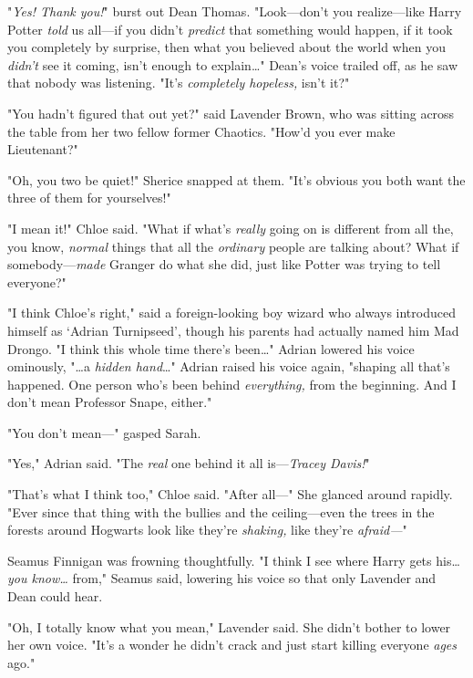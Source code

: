 "\emph{Yes! Thank you!}" burst out Dean Thomas. "Look---don't you 
realize---like Harry Potter \emph{told} us all---if you didn't \emph{predict} 
that something would happen, if it took you completely by surprise, then what 
you believed about the world when you \emph{didn't} see it coming, isn't enough 
to explain{\ldots}" Dean's voice trailed off, as he saw that nobody was 
listening. "It's \emph{completely hopeless,} isn't it?"

"You hadn't figured that out yet?" said Lavender Brown, who was sitting across 
the table from her two fellow former Chaotics. "How'd you ever make Lieutenant?"

"Oh, you two be quiet!" Sherice snapped at them. "It's obvious you both want 
the three of them for yourselves!"

"I mean it!" Chloe said. "What if what's \emph{really} going on is different 
from all the, you know, \emph{normal} things that all the \emph{ordinary} 
people are talking about? What if somebody---\emph{made} Granger do what she 
did, just like Potter was trying to tell everyone?"

"I think Chloe's right," said a foreign-looking boy wizard who always 
introduced himself as `Adrian Turnipseed', though his parents had actually 
named him Mad Drongo. "I think this whole time there's been{\ldots}" Adrian 
lowered his voice ominously, "{\ldots}a \emph{hidden hand}{\ldots}" Adrian 
raised his voice again, "shaping all that's happened. One person who's been 
behind \emph{everything,} from the beginning. And I don't mean Professor Snape, 
either."

"You don't mean---" gasped Sarah.

"Yes," Adrian said. "The \emph{real} one behind it all is---\emph{Tracey 
Davis!}"

"That's what I think too," Chloe said. "After all---" She glanced around 
rapidly. "Ever since that thing with the bullies and the ceiling---even the 
trees in the forests around Hogwarts look like they're \emph{shaking,} like 
they're \emph{afraid---}"

Seamus Finnigan was frowning thoughtfully. "I think I see where Harry gets 
his{\ldots} \emph{you know{\ldots}} from," Seamus said, lowering his voice so 
that only Lavender and Dean could hear.

"Oh, I totally know what you mean," Lavender said. She didn't bother to lower 
her own voice. "It's a wonder he didn't crack and just start killing everyone 
\emph{ages} ago."


